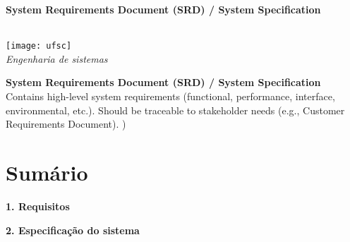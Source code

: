 \documentclass[journal]{IEEEtran}
\begin{document}
\begin{titlepage}

    \centering
    \vspace*{3cm}
    {\Huge\bfseries System Requirements Document (SRD) / System Specification \\[1.5em]}

    {\large\textit{}}\\[7em]
    \texttt{[image: ufsc]}\\[1em]
    {\Large \textit{Engenharia de sistemas}}
    \vfill
\end{titlepage}






\newpage

\begin{center}
    \Large\textbf{System Requirements Document (SRD) / System Specification}\\[2em]
    \large Contains high-level system requirements
        (functional, performance, interface, environmental,
        etc.).
        Should be traceable to stakeholder needs (e.g.,
        Customer Requirements Document). )%

\end{center}






\newpage
\section*{Sumário}


\begin{tcolorbox}[colback=gray!20, colframe=white, boxrule=0pt, arc=0pt]
\textbf{1. Requisitos} \hfill \textbf{\pageref{sec:requisitos}}
\end{tcolorbox}

\begin{tcolorbox}[colback=gray!20, colframe=white, boxrule=0pt, arc=0pt]
\textbf{2. Especificação do sistema} \hfill \textbf{\pageref{sec:especificacao}}
\end{tcolorbox}






\newpage


\end{document}

